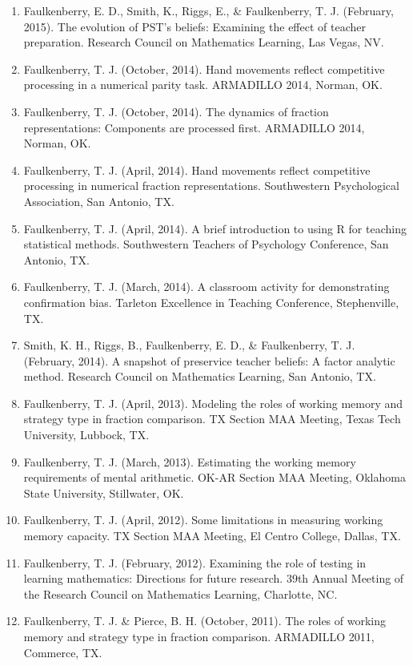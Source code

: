 \documentclass[article,10pt]{article}
\begin{document}
\begin{enumerate}
\item Faulkenberry, E. D., Smith, K., Riggs, E., \& Faulkenberry, T. J. (February, 2015). The evolution of PST’s beliefs: Examining the effect of teacher preparation. Research Council on Mathematics Learning, Las Vegas, NV.
\item Faulkenberry, T. J. (October, 2014).  Hand movements reflect competitive processing in a numerical parity task. ARMADILLO 2014, Norman, OK.
\item Faulkenberry, T. J. (October, 2014). The dynamics of fraction representations: Components are processed first. ARMADILLO 2014, Norman, OK.
\item Faulkenberry, T. J. (April, 2014). Hand movements reflect competitive processing in numerical fraction representations. Southwestern Psychological Association, San Antonio, TX.
\item Faulkenberry, T. J. (April, 2014). A brief introduction to using R for teaching statistical methods. Southwestern Teachers of Psychology Conference, San Antonio, TX.
\item Faulkenberry, T. J. (March, 2014). A classroom activity for demonstrating confirmation bias. Tarleton Excellence in Teaching Conference, Stephenville, TX.
\item Smith, K. H., Riggs, B., Faulkenberry, E. D., \& Faulkenberry, T. J. (February, 2014). A snapshot of preservice teacher beliefs: A factor analytic method. Research Council on Mathematics Learning, San Antonio, TX.
\item Faulkenberry, T. J. (April, 2013). Modeling the roles of working memory and strategy type in fraction comparison. TX Section MAA Meeting, Texas Tech University, Lubbock, TX.
\item Faulkenberry, T. J. (March, 2013). Estimating the working memory requirements of mental arithmetic. OK-AR Section MAA Meeting, Oklahoma State University, Stillwater, OK.
\item Faulkenberry, T. J. (April, 2012). Some limitations in measuring working memory capacity. TX Section MAA Meeting, El Centro College, Dallas, TX.
\item Faulkenberry, T. J. (February, 2012). Examining the role of testing in learning mathematics: Directions for future research. 39th Annual Meeting of the Research Council on Mathematics Learning, Charlotte, NC.
\item Faulkenberry, T. J. \& Pierce, B. H. (October, 2011). The roles of working memory and strategy type in fraction comparison. ARMADILLO 2011, Commerce, TX.

\end{enumerate}
\end{document}
